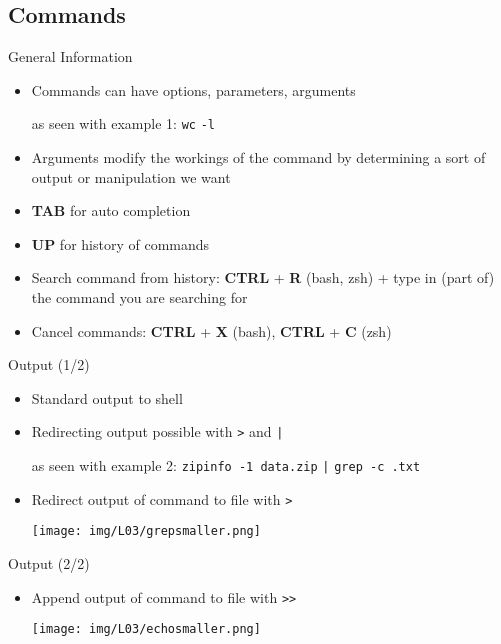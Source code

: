 \documentclass[hyperref={pdfpagelabels=false},aspectratio=169]{beamer}
\begin{document}
\subsection*{Commands}
\begin{frame}{General Information}
    \begin{itemize}
        \item Commands can have options, parameters, arguments
        
        as seen with example 1: \texttt{wc} \textcolor{THorange}{\texttt{-l}}
        \item Arguments modify the workings of the command by determining a sort of output or manipulation we want
        \item \textbf{TAB} for auto completion
        \item \textbf{UP} for history of commands
        \item Search command from history: \textbf{CTRL} + \textbf{R} (bash, zsh) + type in (part of) the command you are searching for
        \item Cancel commands: \textbf{CTRL} + \textbf{X} (bash), \textbf{CTRL} + \textbf{C} (zsh)
    \end{itemize}
\end{frame}


\begin{frame}{Output \small(1/2)}
    \begin{itemize}
        \item Standard output to shell
        \item Redirecting output possible with \textcolor{THviolett}{\texttt{>}} and \textcolor{THviolett}{\texttt{|}}
        
        as seen with example 2: \texttt{zipinfo -1 data.zip} \textcolor{THorange}{\texttt{|}} \texttt{grep -c .txt}
        \item Redirect output of command to file with \texttt{>}
        
        \vspace{2pt}
        \texttt{[image: img/L03/grepsmaller.png]}

    \end{itemize}
\end{frame}


\begin{frame}{Output \small(2/2)}
    \begin{itemize}

        \item Append output of command to file with \texttt{>}\texttt{>}
        
        
        \vspace{2pt}
        \texttt{[image: img/L03/echosmaller.png]}
    \end{itemize}
\end{frame}
\end{document}
